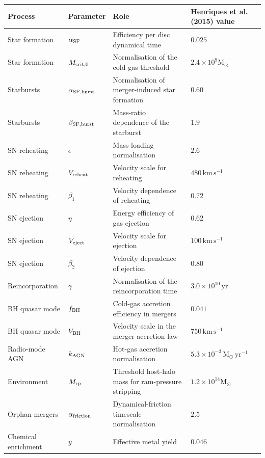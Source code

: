 \documentclass[11pt,a4paper]{article}
\newcommand{\Msun}{\mathrm{M}_{\odot}}
\begin{document}
\begin{longtable}{>{\raggedright\arraybackslash}p{3.1cm}>{\raggedright\arraybackslash}p{3.1cm}>{\raggedright\arraybackslash}p{6.3cm}>{\raggedleft\arraybackslash}p{2.2cm}}
\toprule
\textbf{Process} & \textbf{Parameter} & \textbf{Role} & \textbf{Henriques et al. (2015) value} \\
\midrule
\endhead
Star formation & $\alpha_{\rm SF}$ & Efficiency per disc dynamical time & $0.025$ \\
Star formation & $M_{\rm crit,0}$ & Normalisation of the cold-gas threshold & $2.4\times10^9\Msun$ \\
Starbursts & $\alpha_{\rm SF,burst}$ & Normalisation of merger-induced star formation & $0.60$ \\
Starbursts & $\beta_{\rm SF,burst}$ & Mass-ratio dependence of the starburst & $1.9$ \\
SN reheating & $\epsilon$ & Mass-loading normalisation & $2.6$ \\
SN reheating & $V_{\rm reheat}$ & Velocity scale for reheating & $480\,\mathrm{km\,s^{-1}}$ \\
SN reheating & $\beta_1$ & Velocity dependence of reheating & $0.72$ \\
SN ejection & $\eta$ & Energy efficiency of gas ejection & $0.62$ \\
SN ejection & $V_{\rm eject}$ & Velocity scale for ejection & $100\,\mathrm{km\,s^{-1}}$ \\
SN ejection & $\beta_2$ & Velocity dependence of ejection & $0.80$ \\
Reincorporation & $\gamma$ & Normalisation of the reincorporation time & $3.0\times10^{10}\,\mathrm{yr}$ \\
BH quasar mode & $f_{\rm BH}$ & Cold-gas accretion efficiency in mergers & $0.041$ \\
BH quasar mode & $V_{\rm BH}$ & Velocity scale in the merger accretion law & $750\,\mathrm{km\,s^{-1}}$ \\
Radio-mode AGN & $k_{\rm AGN}$ & Hot-gas accretion normalisation & $5.3\times10^{-3}\,\Msun\,\mathrm{yr}^{-1}$ \\
Environment & $M_{\rm rp}$ & Threshold host-halo mass for ram-pressure stripping & $1.2\times10^{14}\Msun$ \\
Orphan mergers & $\alpha_{\rm friction}$ & Dynamical-friction timescale normalisation & $2.5$ \\
Chemical enrichment & $y$ & Effective metal yield & $0.046$ \\
\bottomrule
\end{longtable}
\end{document}
